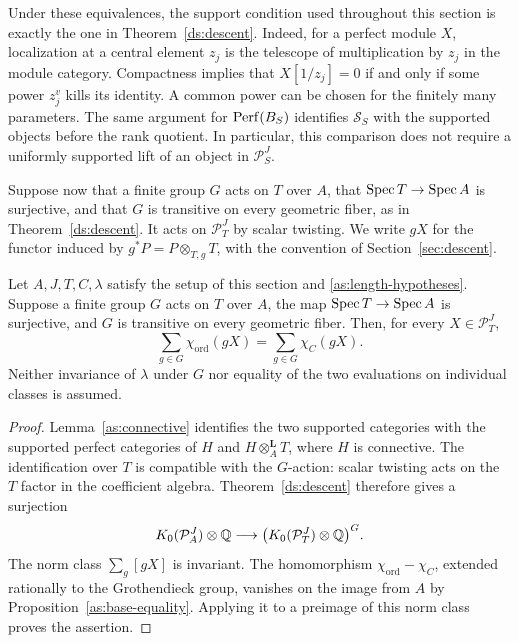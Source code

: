 Under these equivalences, the support condition used throughout this
section is exactly the one in Theorem~\ref{ds:descent}. Indeed, for
a perfect module $X$, localization at a central element $z_j$ is
the telescope of multiplication by $z_j$ in the module category.
Compactness implies that $X[1/z_j]=0$ if and only if some power
$z_j^v$ kills its identity. A common power can be chosen for the
finitely many parameters. The same argument for $\operatorname{Perf}(B_S)$
identifies $\mathcal S_S$ with the supported objects before the
rank quotient. In particular, this comparison does not require a
uniformly supported lift of an object in $\mathcal P_S^J$.

Suppose now that a finite group $G$ acts on $T$ over $A$, that
$\operatorname{Spec} T\to\operatorname{Spec} A$ is surjective, and that $G$ is transitive
on every geometric fiber, as in Theorem~\ref{ds:descent}. It acts
on $\mathcal P_T^J$ by scalar twisting. We write $gX$ for the
functor induced by $g^*P=P\otimes_{T,g}T$, with the convention of
Section~\ref{sec:descent}.

\begin{theorem}
\label{as:norm}
Let $A,J,T,C,\lambda$ satisfy the setup of this section and
\eqref{as:length-hypotheses}. Suppose a finite group $G$ acts on $T$
over $A$, the map $\operatorname{Spec} T\to\operatorname{Spec} A$ is surjective, and $G$ is
transitive on every geometric fiber. Then, for every
$X\in\mathcal P_T^J$,
\[
 \sum_{g\in G}\chi_{\mathrm{ord}}(gX)
   =\sum_{g\in G}\chi_C(gX).
\]
Neither invariance of $\lambda$ under $G$ nor equality of the two
evaluations on individual classes is assumed.
\end{theorem}

\begin{proof}
Lemma~\ref{as:connective} identifies the two supported categories
with the supported perfect categories of $H$ and
$H\otimes_A^{\mathbf L}T$, where $H$ is connective.
The identification over $T$ is compatible with the $G$-action:
scalar twisting acts on the $T$ factor in the coefficient algebra.
Theorem~\ref{ds:descent} therefore gives a surjection
\[
 K_0(\mathcal P_A^J)\otimes\mathbb{Q}
 \longrightarrow
 \bigl(K_0(\mathcal P_T^J)\otimes\mathbb{Q}\bigr)^G.
\]
The norm class $\sum_g[gX]$ is invariant. The homomorphism
$\chi_{\mathrm{ord}}-\chi_C$, extended rationally to the
Grothendieck group, vanishes on the image from $A$ by
Proposition~\ref{as:base-equality}. Applying it to a preimage
of this norm class proves the assertion.
\end{proof}
